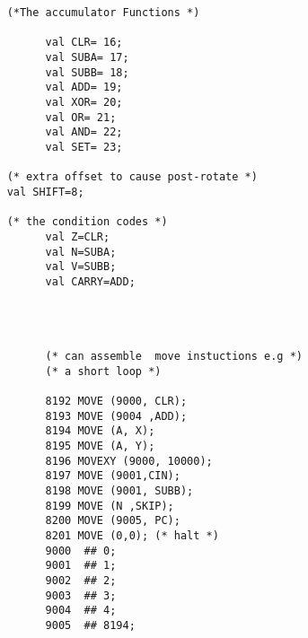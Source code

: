 \begin{verbatim}
	(*The accumulator Functions *)

          val CLR= 16;
          val SUBA= 17;
          val SUBB= 18;
          val ADD= 19;
          val XOR= 20;
          val OR= 21;
          val AND= 22;
          val SET= 23;

	(* extra offset to cause post-rotate *)
	val SHIFT=8;

	(* the condition codes *)
          val Z=CLR;
          val N=SUBA;
          val V=SUBB;
          val CARRY=ADD;




          (* can assemble  move instuctions e.g *)
          (* a short loop *)

          8192 MOVE (9000, CLR);
          8193 MOVE (9004 ,ADD);
          8194 MOVE (A, X);
          8195 MOVE (A, Y);
          8196 MOVEXY (9000, 10000);
          8197 MOVE (9001,CIN);
          8198 MOVE (9001, SUBB);
          8199 MOVE (N ,SKIP);
          8200 MOVE (9005, PC);
          8201 MOVE (0,0); (* halt *)           
          9000  ## 0;
          9001  ## 1;
          9002  ## 2;
          9003  ## 3;
          9004  ## 4;
          9005  ## 8194;
\end{verbatim}
